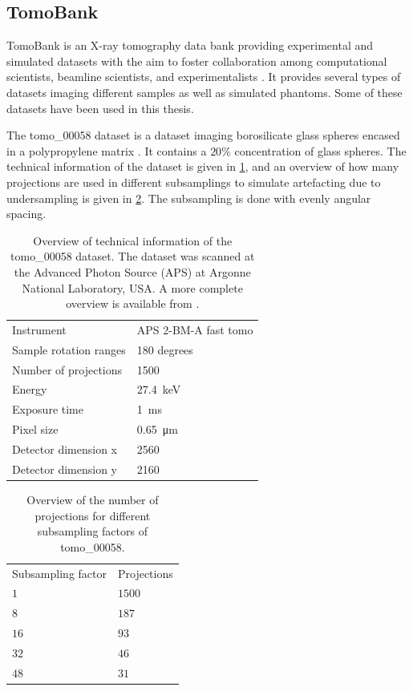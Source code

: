 \subsection{TomoBank}
TomoBank is an X-ray tomography data bank providing experimental and simulated datasets with the aim to foster collaboration among computational scientists, beamline scientists, and experimentalists \cite{TomoBank}. It provides several types of datasets imaging different samples as well as simulated phantoms. Some of these datasets have been used in this thesis.

The tomo\_00058 dataset is a dataset imaging borosilicate glass spheres encased in a polypropylene matrix \cite{datasetglassspheres}. It contains a $20\%$ concentration of glass spheres. The technical information of the dataset is given in \cref{tab:tomo00058}, and an overview of how many projections are used in different subsamplings to simulate artefacting due to undersampling is given in \cref{tab:projectionsubsampling}. The subsampling is done with evenly angular spacing. 

\begin{table}[htbp]
    \centering
    \caption[Dataset information tomo\_00058]{Overview of technical information of the tomo\_00058 dataset. The dataset was scanned at the Advanced Photon Source (APS) at Argonne National Laboratory, USA. A more complete overview is available from \cite{datasetglassspheres}. }
    \label{tab:tomo00058}
    \begin{tabular}{ll}
    \hline
    Instrument & APS 2-BM-A fast tomo\\
    Sample rotation ranges & 180 degrees \\
    Number of projections & 1500 \\
    Energy & \SI{27.4}{\kilo \electronvolt}\\
    Exposure time & \SI{1}{\milli \second}\\
    Pixel size & \SI{0.65}{\micro \meter} \\
    Detector dimension x & 2560 \\
    Detector dimension y & 2160 \\
    \hline
    \end{tabular}
\end{table}

\begin{table}[htbp]
    \centering
    \caption[Projection subsampling overview tomo\_00058]{Overview of the number of projections for different subsampling factors of tomo\_00058. }
    \label{tab:projectionsubsampling}
    \begin{tabular}{ll}
    \hline
    Subsampling factor & Projections \\
    \hhline{==}
    $1$ & $1500$ \\
    $8$ & $187$ \\
    $16$ & $93$ \\
    $32$ & $46$ \\
    $48$ & $31$ \\
    \hline
    \end{tabular}
\end{table}

